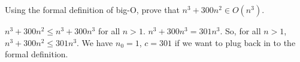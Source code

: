 
Using the formal definition of big-O, prove that $n^3 + 300 n^2 \in
O(n^3)$.

\begin{solution}
  $n^3 + 300n^2 \leq n^3 + 300n^3$ for all $n > 1$. $n^3 + 300n^3 =
  301 n^3$.  So, for all $n > 1$, $n^3 + 300 n^2 \leq 301n^3$. We have
  $n_0 = 1$, $c = 301$ if we want to plug back in to the formal
  definition.
\end{solution}
